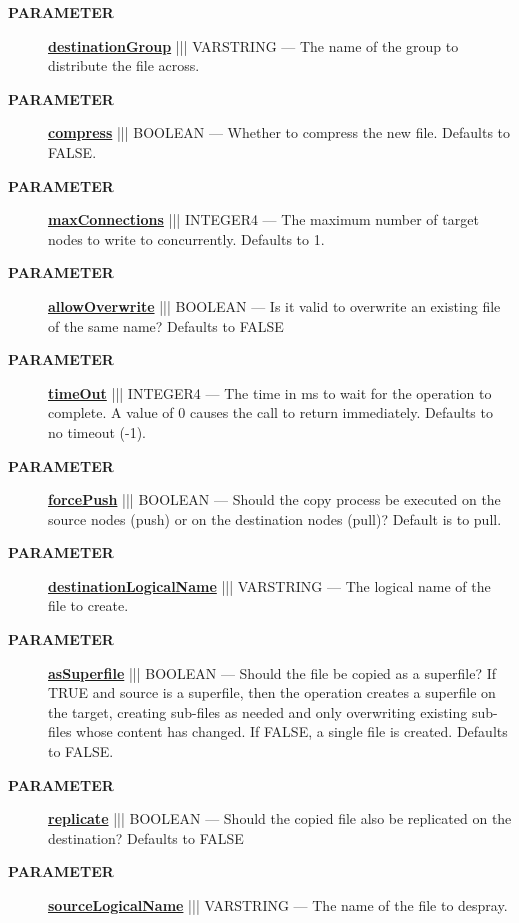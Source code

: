 \par
\begin{description}
\item [\colorbox{tagtype}{\color{white} \textbf{\textsf{PARAMETER}}}] \textbf{\underline{destinationGroup}} ||| VARSTRING --- The name of the group to distribute the file across.
\item [\colorbox{tagtype}{\color{white} \textbf{\textsf{PARAMETER}}}] \textbf{\underline{compress}} ||| BOOLEAN --- Whether to compress the new file. Defaults to FALSE.
\item [\colorbox{tagtype}{\color{white} \textbf{\textsf{PARAMETER}}}] \textbf{\underline{maxConnections}} ||| INTEGER4 --- The maximum number of target nodes to write to concurrently. Defaults to 1.
\item [\colorbox{tagtype}{\color{white} \textbf{\textsf{PARAMETER}}}] \textbf{\underline{allowOverwrite}} ||| BOOLEAN --- Is it valid to overwrite an existing file of the same name? Defaults to FALSE
\item [\colorbox{tagtype}{\color{white} \textbf{\textsf{PARAMETER}}}] \textbf{\underline{timeOut}} ||| INTEGER4 --- The time in ms to wait for the operation to complete. A value of 0 causes the call to return immediately. Defaults to no timeout (-1).
\item [\colorbox{tagtype}{\color{white} \textbf{\textsf{PARAMETER}}}] \textbf{\underline{forcePush}} ||| BOOLEAN --- Should the copy process be executed on the source nodes (push) or on the destination nodes (pull)? Default is to pull.
\item [\colorbox{tagtype}{\color{white} \textbf{\textsf{PARAMETER}}}] \textbf{\underline{destinationLogicalName}} ||| VARSTRING --- The logical name of the file to create.
\item [\colorbox{tagtype}{\color{white} \textbf{\textsf{PARAMETER}}}] \textbf{\underline{asSuperfile}} ||| BOOLEAN --- Should the file be copied as a superfile? If TRUE and source is a superfile, then the operation creates a superfile on the target, creating sub-files as needed and only overwriting existing sub-files whose content has changed. If FALSE, a single file is created. Defaults to FALSE.
\item [\colorbox{tagtype}{\color{white} \textbf{\textsf{PARAMETER}}}] \textbf{\underline{replicate}} ||| BOOLEAN --- Should the copied file also be replicated on the destination? Defaults to FALSE
\item [\colorbox{tagtype}{\color{white} \textbf{\textsf{PARAMETER}}}] \textbf{\underline{sourceLogicalName}} ||| VARSTRING --- The name of the file to despray.

\end{description}
